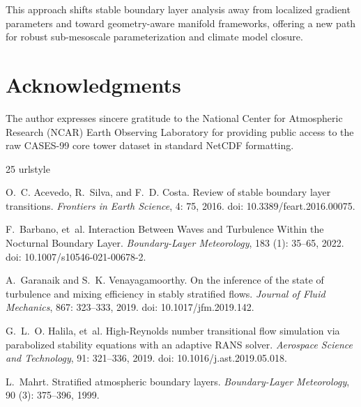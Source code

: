 This approach shifts stable boundary layer analysis away from localized gradient parameters and toward geometry-aware manifold frameworks, offering a new path for robust sub-mesoscale parameterization and climate model closure.

\section*{Acknowledgments}
The author expresses sincere gratitude to the National Center for Atmospheric Research (NCAR) Earth Observing Laboratory for providing public access to the raw CASES-99 core tower dataset in standard NetCDF formatting.

\begin{thebibliography}{25}
\providecommand{\natexlab}[1]{#1}
\providecommand{\url}[1]{\texttt{#1}}
\expandafter\ifx\csname urlstyle\endcsname\relax
  \providecommand{\doi}[1]{doi: #1}\else
  \providecommand{\doi}{doi: \begingroup \urlstyle{rm}\Url}\fi

O.~C. Acevedo, R.~Silva, and F.~D. Costa.
\newblock Review of stable boundary layer transitions.
\newblock \emph{Frontiers in Earth Science}, 4: 75, 2016.
\newblock \doi{10.3389/feart.2016.00075}.

F.~Barbano, et~al.
\newblock Interaction Between Waves and Turbulence Within the Nocturnal Boundary Layer.
\newblock \emph{Boundary-Layer Meteorology}, 183 (1): 35--65, 2022.
\newblock \doi{10.1007/s10546-021-00678-2}.

A.~Garanaik and S.~K. Venayagamoorthy.
\newblock On the inference of the state of turbulence and mixing efficiency in stably stratified flows.
\newblock \emph{Journal of Fluid Mechanics}, 867: 323--333, 2019.
\newblock \doi{10.1017/jfm.2019.142}.

G.~L.~O. Halila, et~al.
\newblock High-Reynolds number transitional flow simulation via parabolized stability equations with an adaptive RANS solver.
\newblock \emph{Aerospace Science and Technology}, 91: 321--336, 2019.
\newblock \doi{10.1016/j.ast.2019.05.018}.

L.~Mahrt.
\newblock Stratified atmospheric boundary layers.
\newblock \emph{Boundary-Layer Meteorology}, 90 (3): 375--396, 1999.


\end{thebibliography}
